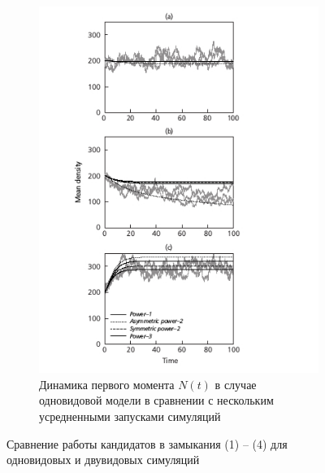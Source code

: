 \begin{figure}[ht]
\begin{subfigure}{.5\textwidth}
		\includegraphics[width=.95\linewidth]{12345.jpg}
		\caption{Динамика первого момента $N(t)$ в случае одновидовой модели в сравнении с нескольким усредненными запусками симуляций} 
		\label{fig:comp1:2}
	\end{subfigure}
	\caption{Сравнение работы кандидатов в замыкания (1) -- (4) для одновидовых и двувидовых симуляций}
	\label{fig:comp1}
\end{figure}

